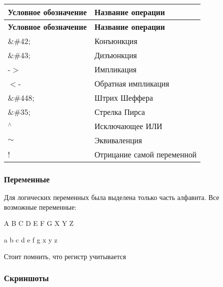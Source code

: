 \tabulinesep=1mm
\begin{longtabu} spread 0pt [c]{*{2}{|X[-1]}|}
\hline
\rowcolor{\tableheadbgcolor}\textbf{ Условное обозначение }&\textbf{ Название операции  }\\
\endfirsthead
\hline
\endfoot
\hline
\rowcolor{\tableheadbgcolor}\textbf{ Условное обозначение }&\textbf{ Название операции  }\\
\endhead
\&\#42; &Конъюнкция \\
\&\#43; &Дизъюнкция \\
-\/$>$ &Импликация \\
$<$-\/ &Обратная импликация \\
\&\#448; &Штрих Шеффера \\
\&\#35; &Стрелка Пирса \\
$^\wedge$ &Исключающее ИЛИ \\
$\sim$ &Эквиваленция \\
! &Отрицание самой переменной \\
\end{longtabu}
\subsubsection*{Переменные}

Для логических переменных была выделена только часть алфавита. Все возможные переменные\+:

{\ttfamily A B C D E F G X Y Z}

{\ttfamily a b c d e f g x y z}

Стоит помнить, что регистр учитывается

\subsubsection*{Скриншоты}

  